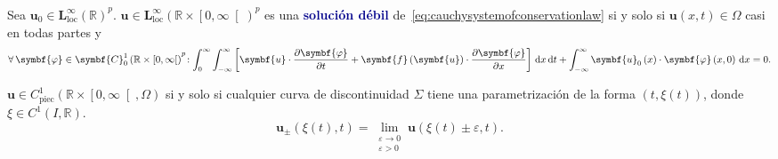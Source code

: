 \begin{definition}
	Sea
	\begin{math}
		\symbf{u}_{0}\in
		{\symbf{L}^{\infty}_{\text{loc}}\left(\mathbb{R}\right)}^{p}
	\end{math}.
	\begin{math}
		\symbf{u}\in
		{\symbf{L}^{\infty}_{\text{loc}}\left(\mathbb{R}\times\left[0,\infty\right[\right)}^{p}
	\end{math}
	es una \textcolor{DarkBlue}{\bfseries solución débil}
	de~\eqref{eq:cauchysystemofconservationlaw} si y solo si
	$\symbf{u}\left(x,t\right)\in\Omega$ casi en todas partes y
	\begin{equation*}
		\forall\symbf{\varphi}\in
		{\symbf{C}^{1}_{0}\left(\mathbb{R}\times\left[0,\infty\right[\right)}^{p}\!:
		\int_{0}^{\infty}
		\int_{\mathbb{-\infty}}^{\infty}
		\left[
			\symbf{u}\cdot
			\diffp{\symbf{\varphi}}{t}+
			\symbf{f}\left(\symbf{u}\right)\cdot
			\diffp{\symbf{\varphi}}{x}
			\right]
		\dl x
		\dl t+
		\int_{-\infty}^{\infty}
		\symbf{u}_{0}\left(x\right)\cdot
		\symbf{\varphi}\left(x,0\right)
		\dl x=
		0.
	\end{equation*}
\end{definition}


\begin{definition}
	\begin{math}
		\symbf{u}\in
		C^{1}_{\text{piec}}
		\left(\mathbb{R}\times\left[0,\infty\right[,\Omega\right)
	\end{math}
	si y solo si
	cualquier curva de discontinuidad $\Sigma$ tiene una
	parametrización de la forma $\left(t,\xi\left(t\right)\right)$,
	donde $\xi\in C^{1}\left(I,\mathbb{R}\right)$.
	\begin{equation*}
		\symbf{u}_{\pm}\left(\xi\left(t\right),t\right)=
		\lim_{\substack{\varepsilon\to0\\\varepsilon>0}}
		\symbf{u}\left(\xi\left(t\right)\pm\varepsilon,t\right).
	\end{equation*}
\end{definition}

